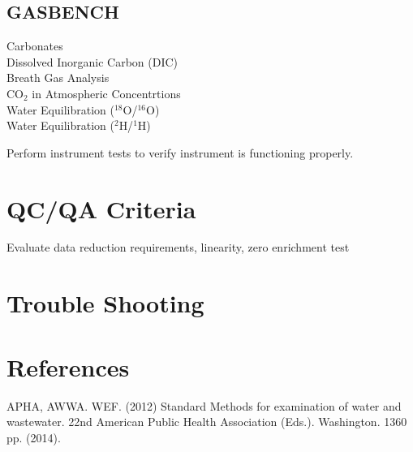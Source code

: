 \documentclass[12pt]{../SOP3_beta}\usepackage[]{graphicx}\usepackage[]{color}
\begin{document}
\subsection{GASBENCH}

\begin{description}

\item[Carbonates]

\item[Dissolved Inorganic Carbon (DIC)]

\item[Breath Gas Analysis]

\item[CO$_2$ in Atmospheric Concentrtions]

\item[Water Equilibration ($^{18}$O/$^{16}$O)]

\item[Water Equilibration ($^2$H/$^1$H)]

\end{description}

\NP Perform instrument tests to verify instrument is functioning properly.

\section{QC/QA Criteria}

\NP Evaluate data reduction requirements, linearity, zero enrichment test

\section{Trouble Shooting}

\section{References}

\NP APHA, AWWA. WEF. (2012) Standard Methods for examination of water and wastewater. 22nd American Public Health Association (Eds.). Washington. 1360 pp. (2014).
\end{document}
